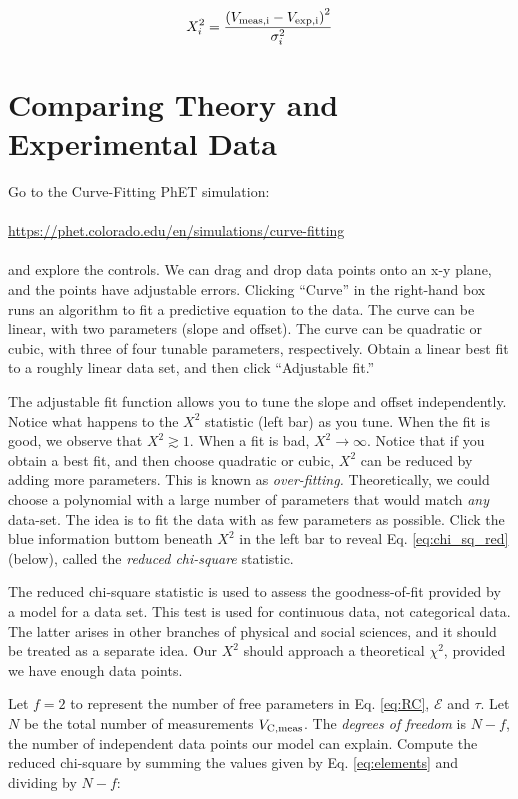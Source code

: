 \documentclass[12pt]{article}
\begin{document}
\begin{equation}
X_i^2 = \frac{\left(V_{\rm meas,i} - V_{\rm exp,i}\right)^2}{\sigma_i^2} \label{eq:elements}
\end{equation}

\section{Comparing Theory and Experimental Data}

\noindent
Go to the Curve-Fitting PhET simulation: \\ \\
\url{https://phet.colorado.edu/en/simulations/curve-fitting} \\ \\
and explore the controls.  We can drag and drop data points onto an x-y plane, and the points have adjustable errors.  Clicking ``Curve'' in the right-hand box runs an algorithm to fit a predictive equation to the data.  The curve can be linear, with two parameters (slope and offset).  The curve can be quadratic or cubic, with three of four tunable parameters, respectively.  Obtain a linear best fit to a roughly linear data set, and then click ``Adjustable fit.''

The adjustable fit function allows you to tune the slope and offset independently.  Notice what happens to the $X^2$ statistic (left bar) as you tune.  When the fit is good, we observe that $X^2 \gtrsim 1$.  When a fit is bad, $X^2 \to \infty$.  Notice that if you obtain a best fit, and then choose quadratic or cubic, $X^2$ can be reduced by adding more parameters.  This is known as \textit{over-fitting.}  Theoretically, we could choose a polynomial with a large number of parameters that would match \textit{any} data-set.  The idea is to fit the data with as few parameters as possible.  Click the blue information buttom beneath $X^2$ in the left bar to reveal Eq. \ref{eq:chi_sq_red} (below), called the \textit{reduced chi-square} statistic.

The reduced chi-square statistic is used to assess the goodness-of-fit provided by a model for a data set.  This test is used for continuous data, not categorical data.  The latter arises in other branches of physical and social sciences, and it should be treated as a separate idea.  Our $X^2$ should approach a theoretical $\chi^2$, provided we have enough data points.

Let $f = 2$ to represent the number of free parameters in Eq. \ref{eq:RC}, $\mathcal{E}$ and $\tau$.  Let $N$ be the total number of measurements $V_{\rm C,meas}$.  The \textit{degrees of freedom} is $N - f$, the number of independent data points our model can explain.  Compute the reduced chi-square by summing the values given by Eq. \ref{eq:elements} and dividing by $N-f$:
\end{document}
